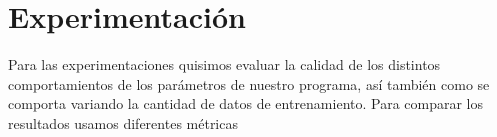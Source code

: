 \section{Experimentación}

Para las experimentaciones quisimos evaluar la calidad de los distintos comportamientos de los parámetros de nuestro programa, así también como se comporta variando la cantidad de datos de entrenamiento. Para comparar los resultados usamos diferentes métricas 